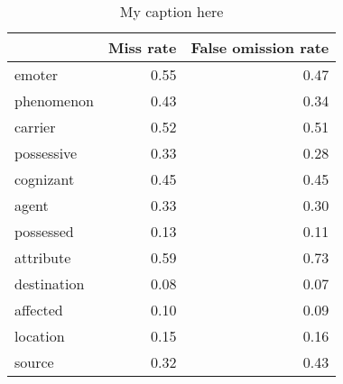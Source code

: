 \begin{table}[!ht]
\centering
\begin{tabular}{lrr}
\toprule
{} &  Miss rate &  False omission rate \\
\midrule
emoter      &       0.55 &                 0.47 \\
phenomenon  &       0.43 &                 0.34 \\
carrier     &       0.52 &                 0.51 \\
possessive  &       0.33 &                 0.28 \\
cognizant   &       0.45 &                 0.45 \\
agent       &       0.33 &                 0.30 \\
possessed   &       0.13 &                 0.11 \\
attribute   &       0.59 &                 0.73 \\
destination &       0.08 &                 0.07 \\
affected    &       0.10 &                 0.09 \\
location    &       0.15 &                 0.16 \\
source      &       0.32 &                 0.43 \\
\bottomrule
\end{tabular}
\caption{My caption here}
\label{tab:PARTICIPANT_ROLE_MOST_USED-oe-combined-errors}
\end{table}